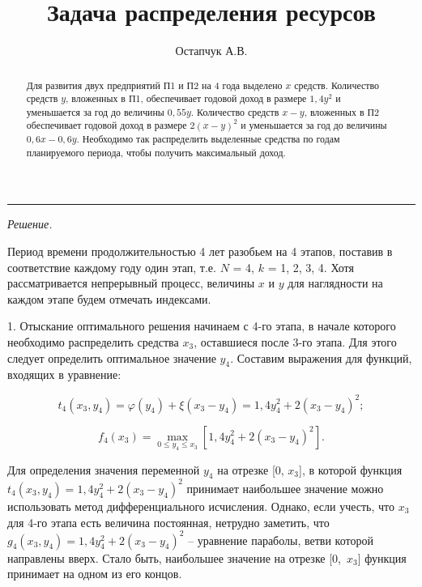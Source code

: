 \documentclass[12pt]{article}
\author{Остапчук А.В.}
\title{Задача распределения ресурсов}
\begin{document}
\maketitle
\renewcommand{\abstractname}{Вариант 5}
\begin{abstract}

Для развития двух предприятий П1 и П2 на 4 года выделено $ x $ средств. Количество средств $ y $, вложенных в П1, обеспечивает годовой доход в размере $ 1{,}4 y^{2} $ и уменьшается за год до величины $ 0{,}55 y $. Количество средств $ x - y $, вложенных в П2 обеспечивает годовой доход в размере $ 2 \left(x - y\right)^{2} $ и уменьшается за год до величины $ 0{,}6 x - 0{,}6 y $. Необходимо так распределить выделенные средства по годам планируемого периода, чтобы получить максимальный доход.

\end{abstract}

\noindent\rule{\textwidth}{1pt}\newline

\textit{Решение.}



Период времени продолжительностью 4 лет разобьем на 4 этапов, поставив в соответствие каждому году один этап, т.е. $ N $ = 4, $ k $ = 1, 2, 3, 4. Хотя рассматривается непрерывный процесс, величины $ x $ и $ y $ для наглядности на каждом этапе будем отмечать индексами.

1. Отыскание оптимального решения начинаем с 4-го этапа, в начале которого необходимо распределить средства $ x_3 $, оставшиеся после 3-го этапа. Для этого следует определить оптимальное значение $ y_4 $. Составим выражения для функций, входящих в уравнение:

$$ t_4 ( x_3, y_4 ) = \varphi ( y_4 ) + \xi ( x_3 - y_4 ) = 1{,}4 y_{4}^{2} + 2 \left(x_{3} - y_{4}\right)^{2} ;$$

$$ f_4 ( x_3 ) = \max_{ 0 \le y_4 \le x_3 }{\left[ 1{,}4 y_{4}^{2} + 2 \left(x_{3} - y_{4}\right)^{2} \right]} .$$

Для определения значения переменной $ y_{4} $ на отрезке [0, $ x_{3} $], в которой функция $ t_4 ( x_3, y_4 ) = 1{,}4 y_{4}^{2} + 2 \left(x_{3} - y_{4}\right)^{2} $ принимает наибольшее значение можно использовать метод дифференциального исчисления. Однако, если учесть, что $ x_{3} $ для 4-го этапа есть величина постоянная, нетрудно заметить, что $ g_4 ( x_3, y_4 ) = 1{,}4 y_{4}^{2} + 2 \left(x_{3} - y_{4}\right)^{2} $ – уравнение параболы, ветви которой направлены вверх. Стало быть, наибольшее значение на отрезке [0,~$ x_{3} $] функция принимает на одном из его концов.
\end{document}
